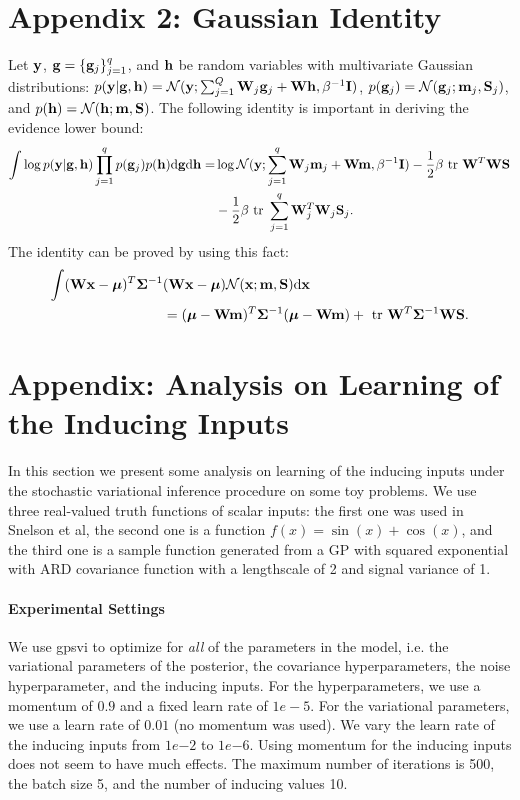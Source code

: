 \documentclass{article} %
\begin{document}
\section{Appendix 2: Gaussian Identity}
Let $\mathbf{y}$, $\mathbf{g} = \{\mathbf{g}_j\}_{j=1}^q$, and $\mathbf{h}$ be random variables with multivariate Gaussian distributions: 
$p(\mathbf{y} | \mathbf{g}, \mathbf{h}) = \mathcal{N}(\mathbf{y}; \sum_{j=1}^Q \mathbf{W}_j \mathbf{g}_j + \mathbf{W} \mathbf{h}, \beta^{-1} \mathbf{I})$, $p(\mathbf{g}_j) = \mathcal{N}(\mathbf{g}_j; \mathbf{m}_j, \mathbf{S}_j)$, and $p(\mathbf{h}) = \mathcal{N}(\mathbf{h}; \mathbf{m}, \mathbf{S})$.
The following identity is important in deriving the evidence lower bound:
\begin{align}
\nonumber
\int \log p(\mathbf{y} | \mathbf{g}, \mathbf{h}) \prod_{j=1}^q p(\mathbf{g}_j) p(\mathbf{h}) \mathrm{d} \mathbf{g} \mathrm{d} \mathbf{h}
=& \log \mathcal{N}(\mathbf{y}; \sum_{j=1}^q \mathbf{W}_j \mathbf{m}_j + \mathbf{W} \mathbf{m}, \beta^{-1} \mathbf{I}) - \frac{1}{2} \beta \mbox{ \rm tr } \mathbf{W}^T \mathbf{W} \mathbf{S} \\
\label{eq:identity}
&- \frac{1}{2} \beta \mbox{ \rm tr } \sum_{j=1}^q \mathbf{W}_j^T \mathbf{W}_j \mathbf{S}_j.
\end{align}
The identity can be proved by using this fact: 
\begin{align}
\nonumber
\int (\mathbf{W}\mathbf{x} - \boldsymbol{\mu})^T \mathbf{\Sigma}^{-1} &(\mathbf{W} \mathbf{x} - \boldsymbol{\mu}) \mathcal{N}(\mathbf{x}; \mathbf{m}, \mathbf{S}) \mathrm{d} \mathbf{x} \\
\nonumber
&= (\boldsymbol{\mu} - \mathbf{W}\mathbf{m})^T \mathbf{\Sigma}^{-1} (\boldsymbol{\mu} - \mathbf{W}\mathbf{m}) + \mbox{ \rm tr } \mathbf{W}^T \mathbf{\Sigma}^{-1} \mathbf{W} \mathbf{S}.
\end{align}

\section{Appendix: Analysis on Learning of the Inducing Inputs}
In this section we present some analysis on learning of the inducing inputs under the stochastic variational inference procedure on some toy problems.
We use three real-valued truth functions of scalar inputs: the first one was used in Snelson et al, the second one is a function $f(x) = \sin(x) + \cos(x)$, and the third one is a sample function generated from a GP with squared exponential with ARD covariance function with a lengthscale of 2 and signal variance of 1.

\noindent \paragraph{Experimental Settings} We use gpsvi to optimize for \textit{all} of the parameters in the model, i.e. the variational parameters of the posterior, the covariance hyperparameters, the noise hyperparameter, and the inducing inputs.
For the hyperparameters, we use a momentum of $0.9$ and a fixed learn rate of $1e-5$. 
For the variational parameters, we use a learn rate of $0.01$ (no momentum was used).
We vary the learn rate of the inducing inputs from $1e{-2}$ to $1e{-6}$.
Using momentum for the inducing inputs does not seem to have much effects.
The maximum number of iterations is 500, the batch size 5, and the number of inducing values 10.
\end{document}
